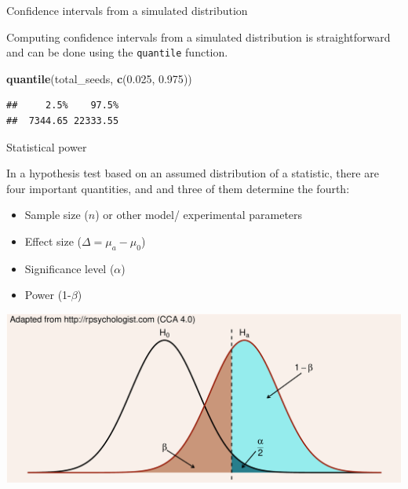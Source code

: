 \documentclass[
  ignorenonframetext,
]{beamer}
\newenvironment{Shaded}{\begin{snugshade}}{\end{snugshade}}
\newcommand{\FloatTok}[1]{\textcolor[rgb]{0.00,0.00,0.81}{#1}}
\newcommand{\KeywordTok}[1]{\textcolor[rgb]{0.13,0.29,0.53}{\textbf{#1}}}
\newcommand{\NormalTok}[1]{#1}
\providecommand{\tightlist}{%
  \setlength{\itemsep}{0pt}\setlength{\parskip}{0pt}}
\begin{document}
\begin{frame}[fragile]{Confidence intervals from a simulated
distribution}
\protect\hypertarget{confidence-intervals-from-a-simulated-distribution}{}

Computing confidence intervals from a simulated distribution is
straightforward and can be done using the \texttt{quantile} function.

\begin{Shaded}
\begin{Highlighting}[]
\KeywordTok{quantile}\NormalTok{(total_seeds, }\KeywordTok{c}\NormalTok{(}\FloatTok{0.025}\NormalTok{, }\FloatTok{0.975}\NormalTok{))}
\end{Highlighting}
\end{Shaded}

\begin{verbatim}
##     2.5%    97.5% 
##  7344.65 22333.55
\end{verbatim}

\end{frame}

\begin{frame}{Statistical power}
\protect\hypertarget{statistical-power}{}

In a hypothesis test based on an assumed distribution of a statistic,
there are four important quantities, and and three of them determine the
fourth:

\begin{itemize}
\tightlist
\item
  Sample size (\(n\)) or other model/ experimental parameters
\item
  Effect size (\(\Delta=\mu_a-\mu_0\))
\item
  Significance level (\(\alpha\))
\item
  Power (1-\(\beta\))
\end{itemize}

\includegraphics{simulation_files/figure-beamer/unnamed-chunk-23-1.pdf}

\end{frame}
\end{document}
